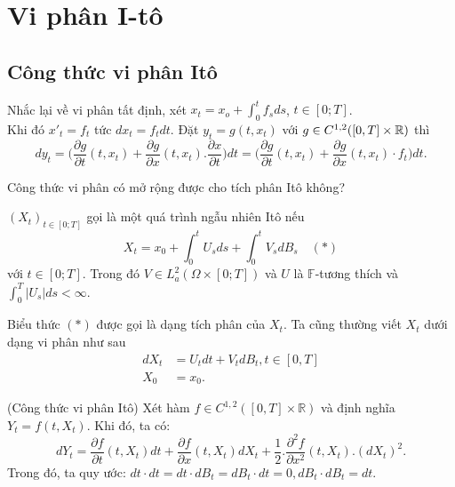 \chapter{Vi phân I-tô}
\section{Công thức vi phân Itô} 
Nhắc lại về vi phân tất định, xét $x_t = x_o +\displaystyle \int_0^tf_sds$, $t\in[0;T]$. \\
Khi đó $x'_t = f_t$ tức $ dx_t = f_tdt$. Đặt $y_t = g(t, x_t)$ với $g \in C^{1,2}([0,T]\times \mathbb{R})$ thì 
\[ dy_t= \bigg(\dfrac{\partial g}{\partial t}(t, x_t)+\dfrac{\partial g}{\partial x}(t, x_t).\dfrac{\partial x}{\partial t}\bigg)dt = \bigg(\dfrac{\partial g}{\partial t}(t, x_t)+\dfrac{\partial g}{\partial x}(t,x_t)\cdot f_t\bigg)dt.\]
\begin{question*}
    Công thức vi phân có mở rộng được cho tích phân Itô không?
\end{question*}
\begin{defn}
    $(X_t)_{t\in[0;T]}$ gọi là một quá trình ngẫu nhiên Itô nếu \[X_t = x_0 +\displaystyle \int_0^tU_sds +\displaystyle \int_0^tV_sdB_s \quad (\ast)\] với $t\in[0;T]$. Trong đó $V \in L_a^2(\Omega\times[0;T])$ và $U$ là $\mathbb F$-tương thích và $\displaystyle \int_0^T|U_s|ds < \infty$.
\end{defn}
\begin{remark*}
    Biểu thức $(\ast)$ được gọi là dạng tích phân của $X_t$. Ta cũng thường viết $X_t$ dưới dạng vi phân như sau 
\begin{align*}
    dX_t &= U_tdt + V_tdB_t, t\in [0,T]\\
    X_0  &= x_0.
\end{align*}
\end{remark*}
\begin{defn}(Công thức vi phân Itô)
Xét hàm $f\in C^{1, 2}([0,T]\times\mathbb R)$ và định nghĩa $Y_t = f(t, X_t)$. Khi đó, ta có: \[dY_t= \dfrac{\partial f}{\partial t}(t, X_t)dt +\dfrac{\partial f}{\partial x}(t, X_t)dX_t + \dfrac{1}{2}.\dfrac{\partial^2 f}{\partial x^2}(t, X_t).(dX_t)^2.\]Trong đó, ta quy ước: $dt\cdot dt=dt\cdot dB_t=dB_t \cdot dt=0, dB_t\cdot dB_t=dt$. 
\end{defn}
